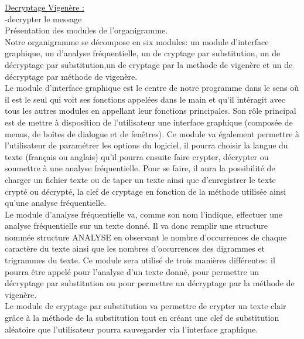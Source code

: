 \documentclass[a4]{article}
\begin{document}
			\underline{Decryptage Vigenère :}\\
			-decrypter le message\\
			
			




Présentation des modules de l'organigramme. \\

	Notre organigramme se décompose en six modules: un module d'interface graphique, un d'analyse fréquentielle, un de cryptage 
  par substitution, un de décryptage par substitution,un de cryptage par la methode de vigenère et un de décryptage par méthode 
  de vigenère. \\

	Le module d'interface graphique est le centre de notre programme dans le sens où il est le seul qui voit ses 
	fonctions appelées dans le main et qu'il intéragit avec tous les autres modules en appellant leur fonctions principales.
	Son rôle principal est de mettre à disposition de l'utilisateur une interface graphique 
	(composée de menus, de boîtes de dialogue et de fenêtres). Ce module va également permettre à l'utilisateur de
	 paramétrer les options du logiciel, il pourra choisir la langue du texte (français ou anglais) qu'il
	 pourra ensuite faire crypter, décrypter ou soumettre à une analyse fréquentielle. Pour se faire, il aura
	 la possibilité de charger un fichier texte ou de taper un texte ainsi que d'enregistrer le texte crypté 
	 ou décrypté, la clef de cryptage en fonction de la méthode utilisée ainsi qu'une analyse fréquentielle. \\
	
	 Le module d'analyse fréquentielle va, comme son nom l'indique, effectuer une analyse fréquentielle sur un texte donné.
	 Il va donc remplir une structure nommée structure ANALYSE en observant le nombre d'occurrences de chaque caractère du 
	 texte ainsi que les nombres d'occurrences des digrammes et trigrammes du texte.
	 Ce module sera utilisé de trois manières différentes: il pourra être appelé pour l'analyse d'un texte donné,
	 pour permettre un décryptage par substitution ou pour permettre un décryptage par la méthode de vigenère. \\

	 Le module de cryptage par substitution va permettre de crypter un texte clair grâce à la méthode de la substitution
	 tout en créant une clef de substitution aléatoire que l'utilisateur pourra sauvegarder via l'interface graphique. \\
	
\end{document}
